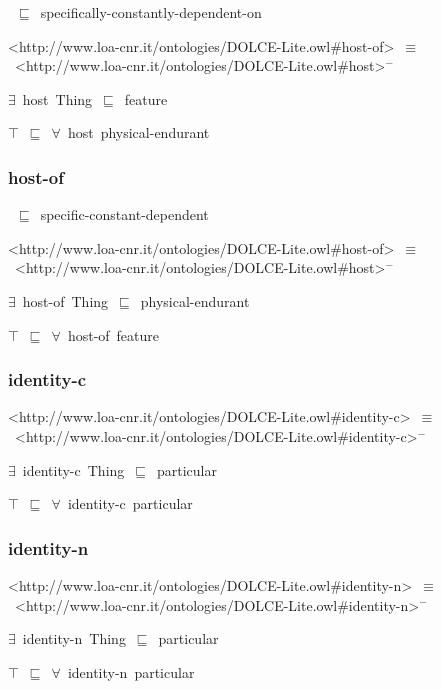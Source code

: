 \documentclass{article}
\begin{document}
~\ensuremath{\sqsubseteq}~specifically-constantly-dependent-on

<http://www.loa-cnr.it/ontologies/DOLCE-Lite.owl#host-of>~\ensuremath{\equiv}~<http://www.loa-cnr.it/ontologies/DOLCE-Lite.owl#host>\ensuremath{^-}

\ensuremath{\exists}~host~Thing~\ensuremath{\sqsubseteq}~feature

\ensuremath{\top}~\ensuremath{\sqsubseteq}~\ensuremath{\forall}~host~physical-endurant

\subsubsection*{host-of}

~\ensuremath{\sqsubseteq}~specific-constant-dependent

<http://www.loa-cnr.it/ontologies/DOLCE-Lite.owl#host-of>~\ensuremath{\equiv}~<http://www.loa-cnr.it/ontologies/DOLCE-Lite.owl#host>\ensuremath{^-}

\ensuremath{\exists}~host-of~Thing~\ensuremath{\sqsubseteq}~physical-endurant

\ensuremath{\top}~\ensuremath{\sqsubseteq}~\ensuremath{\forall}~host-of~feature

\subsubsection*{identity-c}

<http://www.loa-cnr.it/ontologies/DOLCE-Lite.owl#identity-c>~\ensuremath{\equiv}~<http://www.loa-cnr.it/ontologies/DOLCE-Lite.owl#identity-c>\ensuremath{^-}

\ensuremath{\exists}~identity-c~Thing~\ensuremath{\sqsubseteq}~particular

\ensuremath{\top}~\ensuremath{\sqsubseteq}~\ensuremath{\forall}~identity-c~particular

\subsubsection*{identity-n}

<http://www.loa-cnr.it/ontologies/DOLCE-Lite.owl#identity-n>~\ensuremath{\equiv}~<http://www.loa-cnr.it/ontologies/DOLCE-Lite.owl#identity-n>\ensuremath{^-}

\ensuremath{\exists}~identity-n~Thing~\ensuremath{\sqsubseteq}~particular

\ensuremath{\top}~\ensuremath{\sqsubseteq}~\ensuremath{\forall}~identity-n~particular
\end{document}
